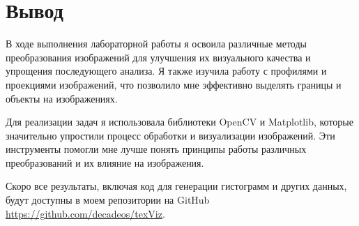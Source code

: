 \documentclass[a4paper,12pt]{article}
\begin{document}
\section{Вывод}
В ходе выполнения лабораторной работы я освоила различные методы преобразования изображений для улучшения их визуального качества и упрощения последующего анализа. Я также изучила работу с профилями и проекциями изображений, что позволило мне эффективно выделять границы и объекты на изображениях.

Для реализации задач я использовала библиотеки OpenCV и Matplotlib, которые значительно упростили процесс обработки и визуализации изображений. Эти инструменты помогли мне лучше понять принципы работы различных преобразований и их влияние на изображения.

Скоро все результаты, включая код для генерации гистограмм и других данных, будут доступны в моем репозитории на GitHub \href{https://github.com/decadeos/texViz}{https://github.com/decadeos/texViz}.
\end{document}
